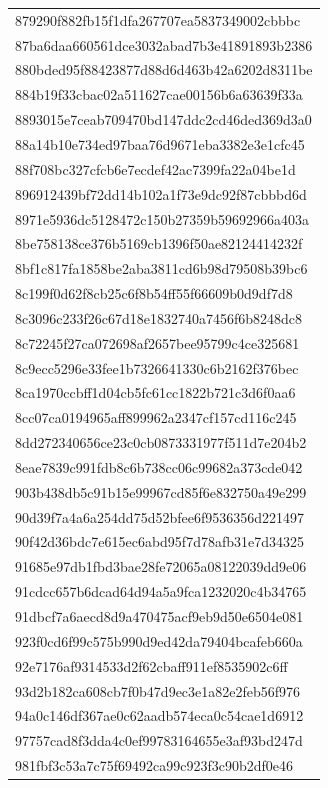 \begin{tabular}{l}
879290f882fb15f1dfa267707ea5837349002cbbbc \\
87ba6daa660561dce3032abad7b3e41891893b2386 \\
880bded95f88423877d88d6d463b42a6202d8311be \\
884b19f33cbac02a511627cae00156b6a63639f33a \\
8893015e7ceab709470bd147ddc2cd46ded369d3a0 \\
88a14b10e734ed97baa76d9671eba3382e3e1cfc45 \\
88f708bc327cfcb6e7ecdef42ac7399fa22a04be1d \\
896912439bf72dd14b102a1f73e9dc92f87cbbbd6d \\
8971e5936dc5128472c150b27359b59692966a403a \\
8be758138ce376b5169cb1396f50ae82124414232f \\
8bf1c817fa1858be2aba3811cd6b98d79508b39bc6 \\
8c199f0d62f8cb25c6f8b54ff55f66609b0d9df7d8 \\
8c3096c233f26c67d18e1832740a7456f6b8248dc8 \\
8c72245f27ca072698af2657bee95799c4ce325681 \\
8c9ecc5296e33fee1b7326641330c6b2162f376bec \\
8ca1970ccbff1d04cb5fc61cc1822b721c3d6f0aa6 \\
8cc07ca0194965aff899962a2347cf157cd116c245 \\
8dd272340656ce23c0cb0873331977f511d7e204b2 \\
8eae7839c991fdb8c6b738cc06c99682a373cde042 \\
903b438db5c91b15e99967cd85f6e832750a49e299 \\
90d39f7a4a6a254dd75d52bfee6f9536356d221497 \\
90f42d36bdc7e615ec6abd95f7d78afb31e7d34325 \\
91685e97db1fbd3bae28fe72065a08122039dd9e06 \\
91cdcc657b6dcad64d94a5a9fca1232020c4b34765 \\
91dbcf7a6aecd8d9a470475acf9eb9d50e6504e081 \\
923f0cd6f99c575b990d9ed42da79404bcafeb660a \\
92e7176af9314533d2f62cbaff911ef8535902c6ff \\
93d2b182ca608cb7f0b47d9ec3e1a82e2feb56f976 \\
94a0c146df367ae0c62aadb574eca0c54cae1d6912 \\
97757cad8f3dda4c0ef99783164655e3af93bd247d \\
981fbf3c53a7c75f69492ca99c923f3c90b2df0e46 \\

\end{tabular}
